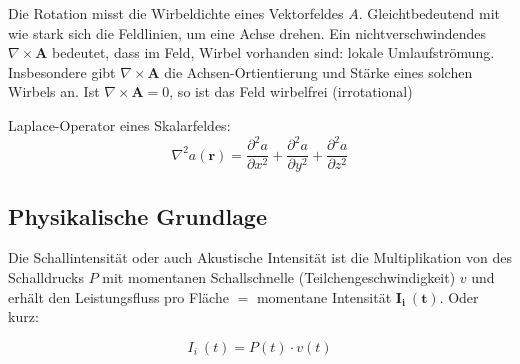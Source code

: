 Die Rotation misst die Wirbeldichte eines Vektorfeldes $A$. Gleichtbedeutend mit wie stark sich die Feldlinien, um eine Achse drehen. Ein nichtverschwindendes $\nabla\times \mathbf{A}$ bedeutet, dass im Feld, Wirbel vorhanden sind: lokale Umlaufströmung. Insbesondere gibt $\nabla\times \mathbf{A}$ die Achsen-Ortientierung und Stärke eines solchen Wirbels an. Ist $\nabla\times \mathbf{A}=0$, so ist das Feld wirbelfrei (irrotational) \newline


Laplace-Operator eines Skalarfeldes:
\begin{equation}
\nabla^2 a(\mathbf{r}) = \frac{\partial^2 a}{\partial x^2} + \frac{\partial^2 a}{\partial y^2} + \frac{\partial^2 a}{\partial z^2}
\end{equation}


\subsection{Physikalische Grundlage}

Die Schallintensität oder auch Akustische Intensität ist die Multiplikation von des Schalldrucks $P$ mit momentanen Schallschnelle (Teilchengeschwindigkeit) $v$ und erhält den Leistungsfluss pro Fläche $=$ momentane Intensität $\mathbf{I_i~(t)}$. Oder kurz:

\begin{equation}
I_i ~(t) = P(t) \cdot v(t)
\label{helmholtz:equationIntensitaetDef}
\end{equation}



